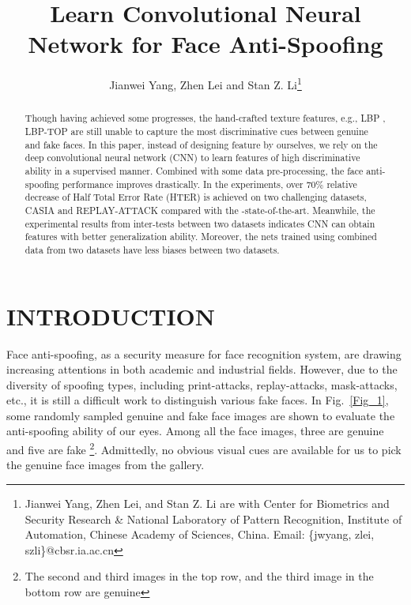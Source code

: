 \documentclass[letterpaper, 10 pt, conference]{ieeeconf}
\title{\LARGE \bf
Learn Convolutional Neural Network for Face Anti-Spoofing
}
\author{Jianwei Yang, Zhen Lei and Stan Z. Li\thanks{Jianwei Yang, Zhen Lei, and Stan Z. Li are with Center for Biometrics and Security Research \& National Laboratory of Pattern Recognition, Institute of Automation, Chinese Academy of Sciences, China. Email: \{jwyang, zlei, szli\}@cbsr.ia.ac.cn
}
}
\begin{document}
\maketitle
\thispagestyle{empty}
\pagestyle{empty}


\begin{abstract}

Though having achieved some progresses, the hand-crafted texture features, e.g., LBP \cite{DBLP:conf/IJCB/Maatta}, LBP-TOP \cite{de2013lbp} are still unable to capture the most discriminative cues between genuine and fake faces. In this paper, instead of designing feature by ourselves, we rely on the deep convolutional neural network (CNN) to learn features of high discriminative ability in a supervised manner. Combined with some data pre-processing, the face anti-spoofing performance improves drastically. In the experiments, over 70\% relative decrease of Half Total Error Rate (HTER) is achieved on two challenging datasets, CASIA \cite{Face_Anti_Spoofing_DataBase_ZhiweiZhang_2012} and REPLAY-ATTACK \cite{Face_Anti_Spoofing_DataBase_Chingovska_2012} compared with the -state-of-the-art. Meanwhile, the experimental results from inter-tests between two datasets indicates CNN can obtain features with better generalization ability. Moreover, the nets trained using combined data from two datasets have less biases between two datasets.

\end{abstract}


\section{INTRODUCTION}

Face anti-spoofing, as a security measure for face recognition system, are drawing increasing attentions in both academic and industrial fields. However, due to the diversity of spoofing types, including print-attacks, replay-attacks, mask-attacks, etc., it is still a difficult work to distinguish various fake faces. In Fig.~\ref{Fig_1}, some randomly sampled genuine and fake face images are shown to evaluate the anti-spoofing ability of our eyes. Among all the face images, three are genuine and five are fake \footnote{The second and third images in the top row, and the third image in the bottom row are genuine}. Admittedly, no obvious visual cues are available for us to pick the genuine face images from the gallery.
\end{document}
